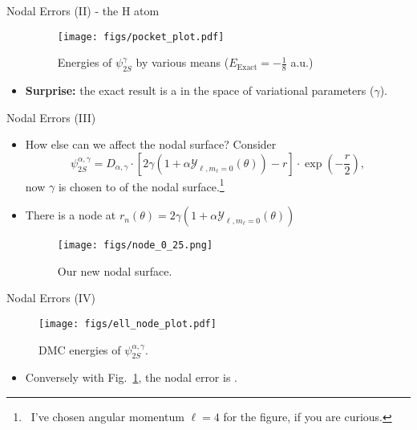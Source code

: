 \documentclass[12pt, pdf, hyperref={draft}, usenames, dvipsnames,
aspectratio=169]{beamer}
\newcommand{\blue}[1]{{\bf\color{NavyBlue}{#1}}}
\begin{document}
\begin{frame}{Nodal Errors (II) - the H atom}
\begin{itemize}

\begin{figure}[H]
  \centering
  \texttt{[image: figs/pocket\_plot.pdf]}
  \caption{Energies of $\psi^{\gamma}_{2S}$ by various means
  ($E_{\text{Exact}}=-\frac{1}{8}$ a.u.)}\label{fig:2s_node}
\end{figure}

  \item {\bf Surprise:} the exact result is a \blue{maximum} in the space of
  variational parameters ($\gamma$).

\end{itemize}
\end{frame}


\begin{frame}{Nodal Errors (III)}
\begin{itemize}
  \item How else can we affect the nodal surface? Consider
  \begin{equation}
    \psi^{\alpha, \gamma}_{2S} = D_{\alpha,\gamma} \cdot
    [ 2\gamma ( 1+\alpha \mathcal{Y}_{\ell, m_{\ell}=0}(\theta)) - r ] \cdot
    \exp{\left( -\frac{r}{2}  \right)},
  \end{equation}
  now $\gamma$ is chosen to \blue{fix the volume} of the nodal
  surface.\footnote{\ I've chosen angular momentum $\ell=4$ for the figure, if
  you are curious.}

  \item There is a node at $r_n(\theta) = 2\gamma(1+\alpha\mathcal{Y}_{\ell,
  m_\ell = 0}(\theta))$

\begin{figure}[H]
  \centering
  \texttt{[image: figs/node\_0\_25.png]}
  \caption{Our new nodal surface.}\label{fig:node}
\end{figure}

\end{itemize}
\end{frame}


\begin{frame}{Nodal Errors (IV)}
\begin{figure}[H]
  \centering
  \texttt{[image: figs/ell\_node\_plot.pdf]}
  \caption{DMC energies of $\psi^{\alpha,
  \gamma}_{2S}$.}\label{fig:ell_node_plot}
\end{figure}

\begin{itemize}

  \item Conversely with Fig.~\ref{fig:2s_node}, the nodal error is
  \blue{positive}.

\end{itemize}
\end{frame}
\end{document}
